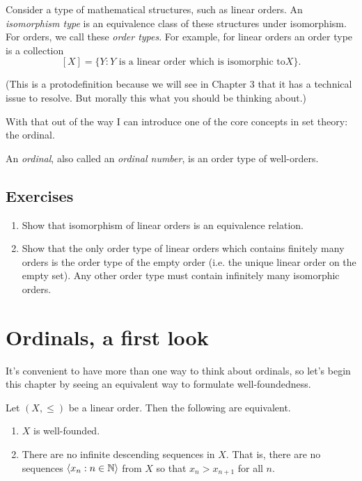 \documentclass[10pt]{amsart}
\begin{document}
\begin{protodefinition}
Consider a type of mathematical structures, such as linear orders. An \emph{isomorphism type} is an equivalence class of these structures under isomorphism. For orders, we call these \emph{order types}. For example, for linear orders an order type is a collection
\[
[X] = \{ Y : Y \text{ is a linear order which is isomorphic to} X\}.
\]
\end{protodefinition}

(This is a protodefinition because we will see in Chapter 3 that it has a technical issue to resolve. But morally this what you should be thinking about.)

With that out of the way I can introduce one of the core concepts in set theory: the ordinal.

\begin{definition}
An \emph{ordinal}, also called an \emph{ordinal number}, is an order type of well-orders. 
\end{definition}

\subsection*{Exercises}

\begin{enumerate}
\item Show that isomorphism of linear orders is an equivalence relation.
\item Show that the only order type of linear orders which contains finitely many orders is the order type of the empty order (i.e. the unique linear order on the empty set). Any other order type must contain infinitely many isomorphic orders.
\end{enumerate}

\newpage

\section{Ordinals, a first look}

It's convenient to have more than one way to think about ordinals, so let's begin this chapter by seeing an equivalent way to formulate well-foundedness.

\begin{lemma}
Let $(X,\le)$ be a linear order. Then the following are equivalent.
\begin{enumerate}
\item $X$ is well-founded.
\item There are no infinite descending sequences in $X$. That is, there are no sequences ${\left\langle x_n : n \in \mathbb{N} \right\rangle}$ from $X$ so that $x_n > x_{n+1}$ for all $n$. 
\end{enumerate}
\end{lemma}
\end{document}

